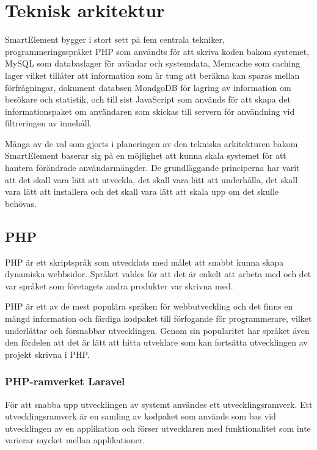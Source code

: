 \section{Teknisk arkitektur}

SmartElement bygger i stort sett på fem centrala tekniker, programmeringsspråket PHP som användts för att skriva koden bakom systemet, MySQL som databaslager för avändar och systemdata, Memcache som caching lager vilket tillåter att information som är tung att beräkna kan sparas mellan förfrågningar, dokument databsen MondgoDB för lagring av information om besökare och statistik, och till sist JavaScript som används för att skapa det informationspaket om användaren som skickas till servern för användning vid filtreringen av innehåll.

Många av de val som gjorts i planeringen av den tekniska arkitekturen bakom SmartElement baserar sig på en möjlighet att kunna skala systemet för att hantera förändrade användarmängder. De grundläggande principerna har varit att det skall vara lätt att utveckla, det skall vara lätt att underhålla, det skall vara lätt att installera och det skall vara lätt att skala upp om det skulle behövas.

\subsection{PHP}

PHP är ett skriptspråk som utvecklats med målet att snabbt kunna skapa dynamiska webbsidor. \citep{phpmanual} Språket valdes för att det är enkelt att arbeta med och det var språket som företagets andra produkter var skrivna med.

PHP är ett av de mest populära språken för webbutveckling \citep{tiobe} och det finns en mängd information och färdiga kodpaket till förfogande för programmerare, vilket underlättar och försnabbar utvecklingen. Genom sin popularitet har språket även den fördelen att det är lätt att hitta utveklare som kan fortsätta utvecklingen av projekt skrivna i PHP.

\subsubsection{PHP-ramverket Laravel}

För att snabba upp utvecklingen av systemt användes ett utvecklingsramverk. Ett utvecklingsramverk är en samling av kodpaket som används som bas vid utvecklingen av en applikation och förser utvecklaren med funktionalitet som inte varierar mycket mellan applikationer.

